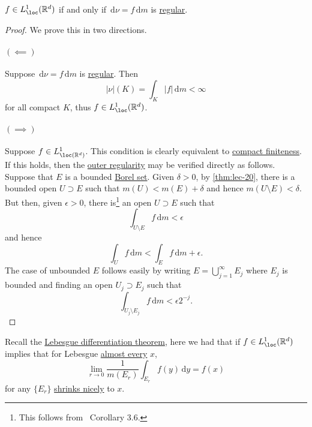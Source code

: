 \begin{lemma}
	\(f \in L^1_{\loc}(\mathbb{R}^d)\) if and only if \(\,\mathrm{d}\nu = f \,\mathrm{d}m\) is \hyperref[def:regular]{regular}.
\end{lemma}
\begin{proof}
	We prove this in two directions.
	\paragraph{\((\impliedby)\)}
	Suppose \(\,\mathrm{d} \nu = f \,\mathrm{d} m\) is \hyperref[def:regular]{regular}. Then
	\[
		\left\vert \nu \right\vert(K) = \int_K \left\vert f \right\vert \,\mathrm{d}m < \infty
	\]
	for all compact \(K\), thus \(f \in L^1_{\loc}(\mathbb{R}^d)\).

	\paragraph{\((\implies)\)}
	Suppose \(f\in L^1_{\loc(\mathbb{R} ^d) }\). This condition is clearly equivalent to
	\hyperref[def:regular-compact-finite]{compact finiteness}. If this holds, then the \hyperref[def:regular-outer-regularity]{outer regularity}
	may be verified directly as follows. Suppose that \(E\) is a bounded \hyperref[def:Borel-set]{Borel set}. Given \(\delta > 0\), by \autoref{thm:lec-20},
	there is a bounded open \(U \supset E\) such that \(m(U) < m(E)+ \delta \) and hence \(m(U\setminus E)< \delta \). But then, given \(\epsilon >0\), there
	is\footnote{This follows from~\cite{folland1999real} Corollary 3.6.} an open \(U \supset E\) such that
	\[
		\int _{U\setminus E}f\,\mathrm{d} m < \epsilon
	\]
	and hence
	\[
		\int _U f\,\mathrm{d} m < \int _E f\,\mathrm{d} m + \epsilon.
	\]
	The case of unbounded \(E\) follows easily by writing \(E = \bigcup_{j=1}^{\infty} E_{j}\)
	where \(E_{j} \) is bounded and finding an open \(U_{j} \supset E_{j} \) such that
	\[
		\int _{U_{j} \setminus E_{j} }f \,\mathrm{d} m < \epsilon 2^{-j}.
	\]
\end{proof}

\begin{prev}
	Recall the \hyperref[thm:Lebesgue-differentiation-theorem]{Lebesgue differentiation theorem}, here we had that if \(f \in L^1_{\loc}(\mathbb{R}^d)\)
	implies that for Lebesgue \hyperref[def:mu-almost-everywhere]{almost every} \(x\),
	\[
		\lim_{r \to 0} \frac{1}{m(E_r)} \int_{E_r} f(y) \,\mathrm{d}y = f(x)
	\]
	for any \(\{E_r\}\) \hyperref[def:shrink-nicely]{shrinks nicely} to \(x\).
\end{prev}


